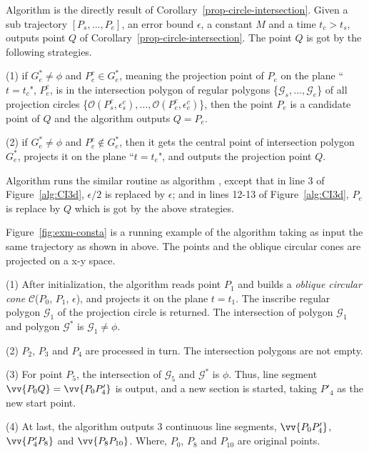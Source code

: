 Algorithm \cista is the directly result of Corollary~\ref{prop-circle-intersection}.
Given a sub trajectory $[P_s,...,P_e]$, an error bound $\epsilon$, a constant $M$ and a time $t_c > t_s$, \cista outputs point $Q$ of Corollary~\ref{prop-circle-intersection}. The point $Q$ is got by the following strategies.

\vspace{1ex}
\ni (1) if $G^*_e \ne \phi$ and $P^c_e \in G^*_e$, meaning the projection point of $P_e$ on the plane ``$t=t_c$", \ie $P^c_e$, is in the intersection polygon of regular polygons \{$\mathcal{G}_s, \dots, \mathcal{G}_e$\} of all projection circles \{$\mathcal{O}(P^c_s, \epsilon^c_s), \ldots, \mathcal{O}(P^c_e, \epsilon^c_e)$\}, then the point $P_e$ is a candidate point of $Q$ and the algorithm outputs $Q=P_e$.

\vspace{1ex}
\ni (2) if $G^*_e \ne \phi$ and $P^c_e \notin G^*_e$, then it gets the central point of intersection polygon $G^*_e$, projects it on the plane ``$t=t_e$", and outputs the projection point $Q$.

\vspace{1ex}
Algorithm \cista runs the similar routine as algorithm \cist, except that in line 3 of Figure~\ref{alg:CI3d}, $\epsilon/2$ is replaced by $\epsilon$; and in lines 12-13 of Figure~\ref{alg:CI3d}, $P_e$ is replace by $Q$ which is got by the above strategies.



\begin{example}
\label{exm-alg-conesta}
Figure~\ref{fig:exm-consta} is a running example of the \cista algorithm taking as input the same trajectory as shown in above.
The points and the oblique circular cones are projected on a x-y space.

\ni (1) After initialization, the \cista algorithm reads point $P_1$ and builds a \emph{oblique circular cone} $\mathcal{C}$($P_0$, $P_{1}$, $\epsilon$), and projects it on the plane $t=t_1$. The inscribe regular polygon $\mathcal{G}_1$ of the projection circle is returned. The intersection of polygon $\mathcal{G}_1$ and polygon $\mathcal{G}^*$ is $\mathcal{G}_1 \ne \phi$.

\ni (2) $P_2$, $P_3$ and $P_4$ are processed in turn. The intersection polygons are not empty.

\ni (3) For point $P_5$, the intersection of $\mathcal{G}_5$ and $\mathcal{G}^*$ is $\phi$. Thus, line segment $\vv{P_0Q} =\vv{P_0P'_4}$ is output, and a new section is started, taking $P'_4$ as the new start point.

\ni (4) At last, the algorithm outputs 3 continuous line segments, \ie $\vv{P_0P'_4}$, $\vv{P'_4P_8}$ and $\vv{P_8P_{10}}$. Where, $P_0$, $P_8$ and $P_{10}$ are original points.
\end{example}



